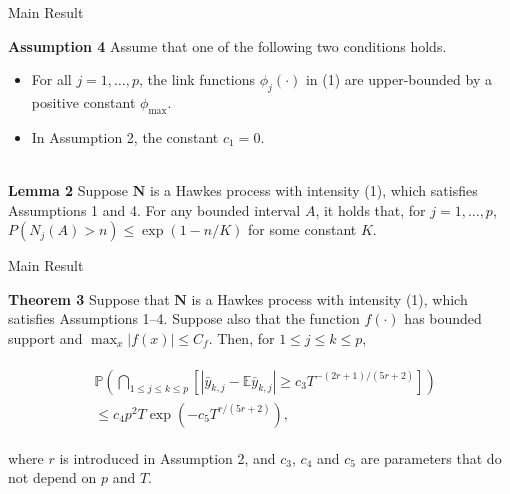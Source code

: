 \documentclass{beamer}		%
\begin{document}
\begin{frame}{Main Result}

\textbf{Assumption 4} Assume that one of the following two conditions holds.
\begin{itemize}
    \item For all $j=1,\ldots, p$, the link functions $\phi_j(\cdot)$ in (1) are upper-bounded by a positive constant $\phi_{\max}$.
    \item In Assumption 2, the constant $c_1 = 0$.
\end{itemize}

~\\
\textbf{Lemma 2} Suppose $\bm{N}$ is a Hawkes process with intensity (1), which satisfies Assumptions 1 and 4. For any bounded interval $A$, it holds that, for $j=1,\ldots,p$, $P(N_j(A)>n) \leq \exp (1-n/K)$ for some constant $K$.


\end{frame}






\begin{frame}{Main Result}

\textbf{Theorem 3} Suppose that $\bm{N}$ is a Hawkes process with intensity (1), which satisfies Assumptions 1–4. Suppose also that the function $f(\cdot)$ has bounded support and $\max_x |f(x)| \leq C_f$. Then, for $1 \leq j \leq k \leq p$,

\begin{align}
\begin{split}
&\mathbb{P}\left(\bigcap_{1 \leq j \leq k \leq p}[|\bar{y}_{k,j} -\mathbb{E}\bar{y}_{k,j}| \ge c_3 T^{-(2r+1)/(5r+2)}]  \right) \\
&\leq c_4 p^2 T \exp \left(-c_5 T^{r/(5r+2)} \right),
\end{split}
\end{align}

where $r$ is introduced in Assumption 2, and $c_3$, $c_4$ and $c_5$ are parameters that do not depend on $p$ and $T$.

\end{frame}
\end{document}
